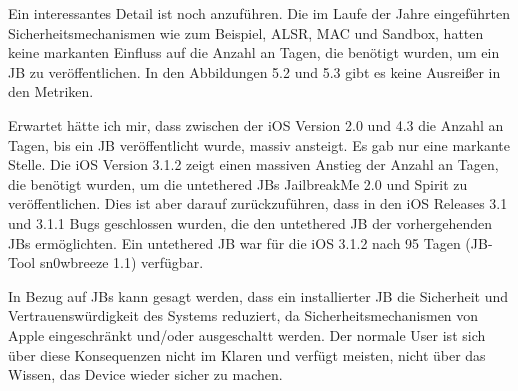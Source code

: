 Ein interessantes Detail ist noch anzuführen. Die im Laufe der Jahre eingeführten Sicherheitsmechanismen wie zum Beispiel, ALSR, MAC und Sandbox, hatten keine markanten Einfluss auf die Anzahl an Tagen, die benötigt wurden, um ein JB zu veröffentlichen. In den Abbildungen 5.2 und 5.3 gibt es keine Ausreißer in den Metriken.\par  
Erwartet hätte ich mir, dass zwischen der iOS Version 2.0 und 4.3 die Anzahl an Tagen, bis ein JB veröffentlicht wurde, massiv ansteigt.  Es gab nur eine markante Stelle. Die iOS Version 3.1.2 zeigt einen massiven Anstieg der Anzahl an Tagen, die benötigt wurden, um die untethered JBs JailbreakMe 2.0 und Spirit zu veröffentlichen. Dies ist aber darauf zurückzuführen, dass in den iOS Releases 3.1 und 3.1.1 Bugs geschlossen wurden,  die den untethered JB der vorhergehenden JBs ermöglichten. Ein untethered JB war für die iOS 3.1.2 nach 95 Tagen (JB-Tool sn0wbreeze 1.1) verfügbar.\par
 
In Bezug auf JBs kann gesagt werden, dass ein installierter JB die Sicherheit und Vertrauenswürdigkeit des Systems reduziert, da Sicherheitsmechanismen von Apple eingeschränkt und/oder ausgeschaltt werden. Der normale User ist sich über diese Konsequenzen nicht im Klaren und verfügt meisten, nicht über das Wissen, das Device wieder sicher zu machen.
